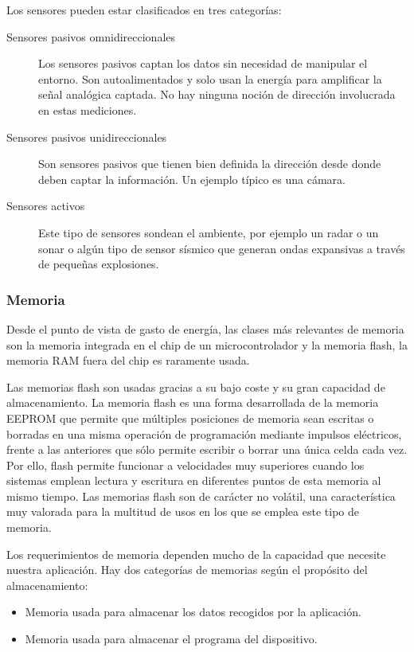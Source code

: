 Los sensores pueden estar clasificados en tres categor\'ias: 

\begin{description}
\item [Sensores pasivos omnidireccionales]
 Los sensores pasivos captan los datos sin necesidad de manipular el entorno. Son autoalimentados y solo usan la energ\'ia para amplificar la se\~nal anal\'ogica captada. No hay ninguna noci\'on de direcci\'on involucrada en estas mediciones.

\item [Sensores pasivos unidireccionales] 
Son sensores pasivos que tienen bien definida la direcci\'on desde donde deben captar la informaci\'on. Un ejemplo t\'ipico es una c\'amara. 

\item [Sensores activos] Este tipo de sensores sondean el ambiente, por ejemplo un radar o un sonar o alg\'un tipo de sensor s\'ismico que generan ondas expansivas a trav\'es de peque\~nas explosiones.
\end{description}

\subsubsection{Memoria}
Desde el punto de vista de gasto de energ\'ia, las clases m\'as relevantes de memoria son la memoria integrada en el chip de un microcontrolador y la memoria flash, la memoria RAM fuera del chip es raramente usada.

Las memorias flash son usadas gracias a su bajo coste y su gran capacidad de almacenamiento. La memoria flash es una forma desarrollada de la memoria EEPROM que permite que m\'ultiples posiciones de memoria sean escritas o borradas en una misma operaci\'on de programaci\'on mediante impulsos el\'ectricos, frente a las anteriores que s\'olo permite escribir o borrar una \'unica celda cada vez. Por ello, flash permite funcionar a velocidades muy superiores cuando los sistemas emplean lectura y escritura en diferentes puntos de esta memoria al mismo tiempo. Las memorias flash son de car\'acter no vol\'atil, una caracter\'istica muy valorada para la multitud de usos en los que se emplea este tipo de memoria. 

Los requerimientos de memoria dependen mucho de la capacidad que necesite nuestra aplicaci\'on. Hay dos categor\'ias de memorias seg\'un el prop\'osito del almacenamiento: 

\begin{itemize}
\item Memoria usada para almacenar los datos recogidos por la aplicaci\'on. 
\item Memoria usada para almacenar el programa del dispositivo.
\end{itemize}


